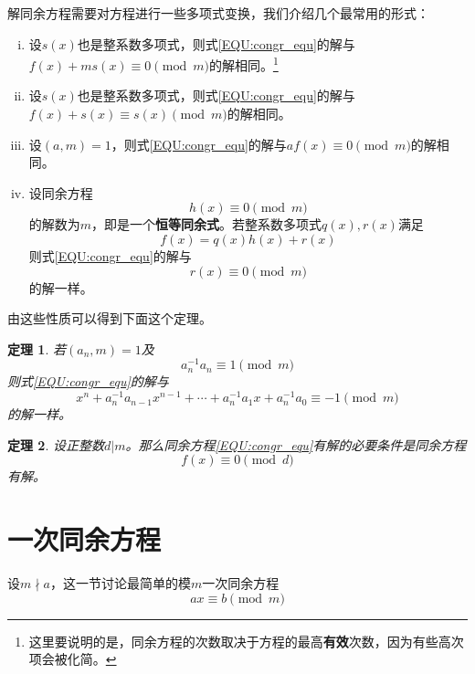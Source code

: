 \documentclass{ctexrep}
\newcommand{\bbold}[1]{\textbf{#1}}
\newtheorem{thrm}{定理}[section]
\begin{document}
解同余方程需要对方程进行一些多项式变换，我们介绍几个最常用的形式：
\begin{enumerate}[(i)]
\item 设$s(x)$也是整系数多项式，则式\ref{EQU:congr_equ}的解与$f(x)+ms(x)\equiv 0\pmod{m}$的解相同。\footnote{这里要说明的是，同余方程的次数取决于方程的最高\bbold{有效}次数，因为有些高次项会被化简。}
\item 设$s(x)$也是整系数多项式，则式\ref{EQU:congr_equ}的解与$f(x)+s(x)\equiv s(x)\pmod{m}$的解相同。
\item 设$(a,m)=1$，则式\ref{EQU:congr_equ}的解与$af(x)\equiv 0\pmod{m}$的解相同。
\item 设同余方程
\begin{displaymath}
h(x)\equiv 0\pmod{m}
\end{displaymath}
的解数为$m$，即是一个\bbold{恒等同余式}。若整系数多项式$q(x),r(x)$满足
\begin{displaymath}
f(x)=q(x)h(x)+r(x)
\end{displaymath}
则式\ref{EQU:congr_equ}的解与
\begin{displaymath}
r(x)\equiv 0\pmod{m}
\end{displaymath}
的解一样。
\end{enumerate}

由这些性质可以得到下面这个定理。

\begin{thrm}
若$(a_n,m)=1$及
\begin{displaymath}
a_n^{-1}a_n\equiv 1\pmod{m}
\end{displaymath}
则式\ref{EQU:congr_equ}的解与
\begin{displaymath}
x^n+a_n^{-1}a_{n-1}x^{n-1}+\dotsb+a_n^{-1}a_1 x+a_n^{-1}a_0\equiv -1\pmod{m}
\end{displaymath}
的解一样。
\end{thrm}

\begin{thrm}
设正整数$d|m$。那么同余方程\ref{EQU:congr_equ}有解的必要条件是同余方程
\begin{displaymath}
f(x)\equiv 0\pmod{d}
\end{displaymath}
有解。
\end{thrm}

\section{一次同余方程}
设$m\nmid a$，这一节讨论最简单的模$m$一次同余方程
\begin{equation}\label{EQU:linear_congr}
ax\equiv b\pmod{m}
\end{equation}
\end{document}
